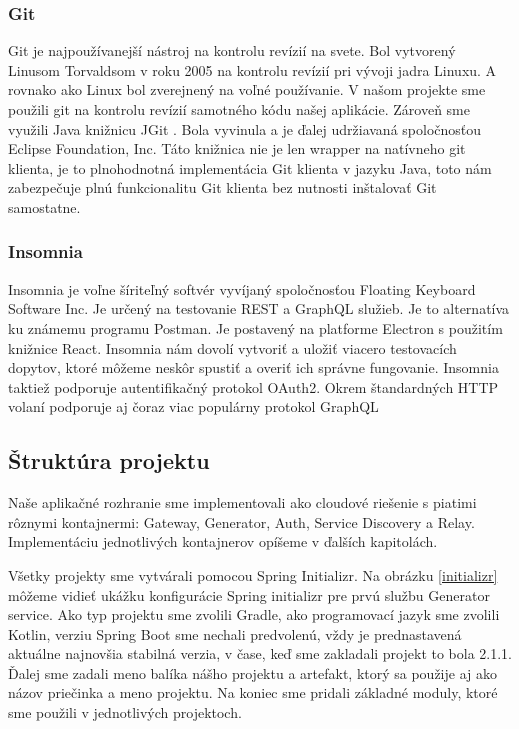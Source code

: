 \subsubsection{Git}
Git je najpoužívanejší nástroj na kontrolu revízií na svete. Bol vytvorený Linusom Torvaldsom v roku 2005 na kontrolu revízií pri vývoji jadra Linuxu. A rovnako ako Linux bol zverejnený na voľné používanie. V našom projekte sme použili git na kontrolu revízií samotného kódu našej aplikácie. Zároveň sme využili Java knižnicu JGit \cite{jgit}. Bola vyvinula a je ďalej udržiavaná spoločnosťou Eclipse Foundation, Inc. Táto knižnica nie je len wrapper na natívneho git klienta, je to plnohodnotná implementácia Git klienta v jazyku Java, toto nám zabezpečuje plnú funkcionalitu Git klienta bez nutnosti inštalovať Git samostatne. 

\subsubsection{Insomnia}
Insomnia \cite{insomnia} je voľne šíriteľný softvér vyvíjaný spoločnosťou Floating Keyboard Software Inc. Je určený na testovanie REST a GraphQL služieb. Je to alternatíva ku známemu programu Postman. Je postavený na platforme Electron s použitím knižnice React. Insomnia nám dovolí vytvoriť a uložiť viacero testovacích dopytov, ktoré môžeme neskôr spustiť a overiť ich správne fungovanie. Insomnia taktiež podporuje autentifikačný protokol OAuth2. Okrem štandardných HTTP volaní podporuje aj čoraz viac populárny protokol GraphQL



\subsection{Štruktúra projektu}
Naše aplikačné rozhranie sme implementovali ako cloudové riešenie s piatimi rôznymi kontajnermi: Gateway, Generator, Auth, Service Discovery a Relay. Implementáciu jednotlivých kontajnerov opíšeme v ďalších kapitolách.

Všetky projekty sme vytvárali pomocou Spring Initializr. Na obrázku \ref{initializr} môžeme vidieť ukážku konfigurácie Spring initializr pre prvú službu Generator service.  Ako typ projektu sme zvolili Gradle, ako programovací jazyk sme zvolili Kotlin, verziu Spring Boot sme nechali predvolenú, vždy je prednastavená aktuálne najnovšia stabilná verzia, v čase, keď sme zakladali projekt to bola 2.1.1. Ďalej sme zadali meno balíka nášho projektu a artefakt, ktorý sa použije aj ako názov priečinka a meno projektu. Na koniec sme pridali základné moduly, ktoré sme použili v jednotlivých projektoch.

